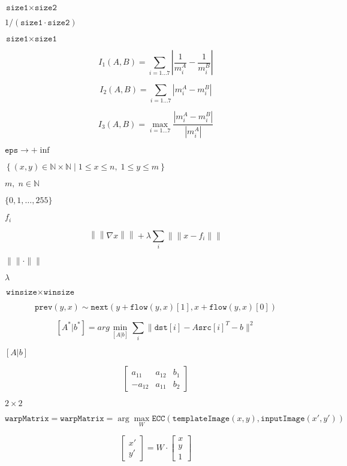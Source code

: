 \documentclass{article}
\begin{document}
$\texttt{size1}\times\texttt{size2}$
\pagebreak

$1/(\texttt{size1}\cdot\texttt{size2})$
\pagebreak

$\texttt{size1}\times\texttt{size1}$
\pagebreak

\[I_1(A,B) =  \sum _{i=1...7}  \left |  \frac{1}{m^A_i} -  \frac{1}{m^B_i} \right |\]
\pagebreak

\[I_2(A,B) =  \sum _{i=1...7}  \left | m^A_i - m^B_i  \right |\]
\pagebreak

\[I_3(A,B) =  \max _{i=1...7}  \frac{ \left| m^A_i - m^B_i \right| }{ \left| m^A_i \right| }\]
\pagebreak

$\texttt{eps}\rightarrow +\inf$
\pagebreak

$\left\{(x,y)\in\mathbb{N}\times\mathbb{N}\mid 1\leq x\leq n,\;1\leq y\leq m\right\}$
\pagebreak

$m,\;n\in\mathbb{N}$
\pagebreak

$\{0,1,\dots,255\}$
\pagebreak

$f_i$
\pagebreak

\[\left\|\left\|\nabla x\right\|\right\| + \lambda\sum_i\left\|\left\|x-f_i\right\|\right\|\]
\pagebreak

$\|\|\cdot\|\|$
\pagebreak

$\lambda$
\pagebreak

$\texttt{winsize}\times\texttt{winsize}$
\pagebreak

\[\texttt{prev} (y,x)  \sim \texttt{next} ( y + \texttt{flow} (y,x)[1],  x + \texttt{flow} (y,x)[0])\]
\pagebreak

\[[A^*|b^*] = arg  \min _{[A|b]}  \sum _i  \| \texttt{dst}[i] - A { \texttt{src}[i]}^T - b  \| ^2\]
\pagebreak

$[A|b]$
\pagebreak

\[\begin{bmatrix} a_{11} & a_{12} & b_1  \\ -a_{12} & a_{11} & b_2  \end{bmatrix}\]
\pagebreak

$2\times 2$
\pagebreak

\[\texttt{warpMatrix} = \texttt{warpMatrix} = \arg\max_{W} \texttt{ECC}(\texttt{templateImage}(x,y),\texttt{inputImage}(x',y'))\]
\pagebreak

\[\begin{bmatrix} x' \\ y' \end{bmatrix} = W \cdot \begin{bmatrix} x \\ y \\ 1 \end{bmatrix}\]
\pagebreak
\end{document}
